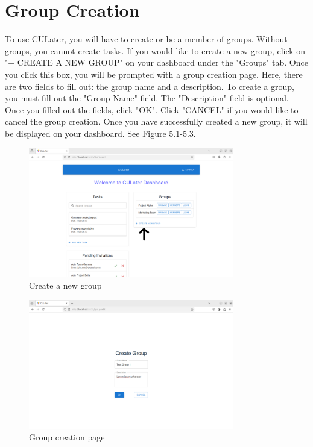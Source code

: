 \documentclass{scrreprt}
\begin{document}
\chapter{Group Creation}

To use CULater, you will have to create or be a member of groups. Without groups, you cannot create tasks. If you would like to create a new group, click on "+ CREATE A NEW GROUP" on your dashboard under the "Groups" tab. Once you click this box, you will be prompted with a group creation page. Here, there are two fields to fill out: the group name and a description. To create a group, you must fill out the "Group Name" field. The "Description" field is optional. Once you filled out the fields, click "OK". Click "CANCEL" if you would like to cancel the group creation. Once you have successfully created a new group, it will be displayed on your dashboard. See Figure 5.1-5.3.\\
\begin{figure}[htbp]
        \centering
        \includegraphics[width=0.8\textwidth]{dahboard_with_tasks_and_groups_and_invites_create_group.png}
	\caption{Create a new group}
	\label{fig:my_label}
\end{figure}
\begin{figure}[htbp]
        \centering
        \includegraphics[width=0.8\textwidth]{group_creation.png}
	\caption{Group creation page}
	\label{fig:my_label}
\end{figure}
\end{document}
